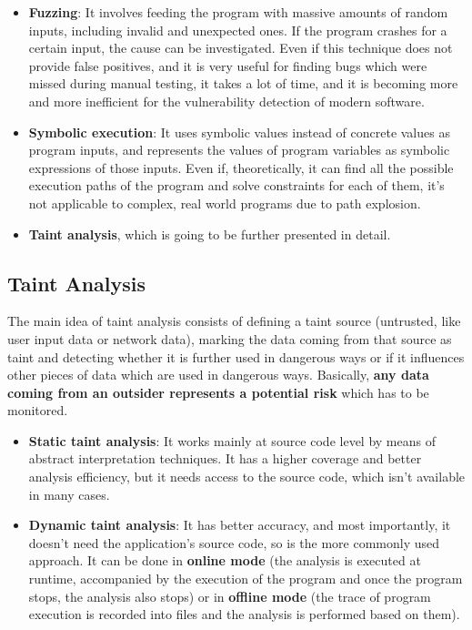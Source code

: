\documentclass[10pt,a4paper,english,onecolumn]{IEEEtran}
\begin{document}
\begin{itemize}
    \item \textbf{Fuzzing}: It involves feeding the program with massive amounts of random inputs, including invalid and unexpected ones. If the program crashes for a certain input, the cause can be investigated. Even if this technique does not provide false positives, and it is very useful for finding bugs which were missed during manual testing, it takes a lot of time, and it is becoming more and more inefficient for the vulnerability detection of modern software.
    \item \textbf{Symbolic execution}: It uses symbolic values instead of concrete values as program inputs, and represents the values of program variables as symbolic expressions of those inputs. Even if, theoretically, it can find all the possible execution paths of the program and solve constraints for each of them, it's not applicable to complex, real world programs due to path explosion.
    \item \textbf{Taint analysis}, which is going to be further presented in detail.
\end{itemize}

\subsection{Taint Analysis}

The main idea of taint analysis consists of defining a taint source (untrusted, like user input data or network data), marking the data coming from that source as taint and detecting whether it is further used in dangerous ways or if it influences other pieces of data which are used in dangerous ways. Basically, \textbf{any data coming from an outsider represents a potential risk} which has to be monitored.

\begin{itemize}
    \item \textbf{Static taint analysis}: It works mainly at source code level by means of abstract interpretation techniques. It has a higher coverage and better analysis efficiency, but it needs access to the source code, which isn't available in many cases.
    \item \textbf{Dynamic taint analysis}: It has better accuracy, and most importantly, it doesn't need the application's source code, so is the more commonly used approach. It can be done in \textbf{online mode} (the analysis is executed at runtime, accompanied by the execution of the program and once the program stops, the analysis also stops) or in \textbf{offline mode} (the trace of program execution is recorded into files and the analysis is performed based on them).
\end{itemize}
\end{document}
